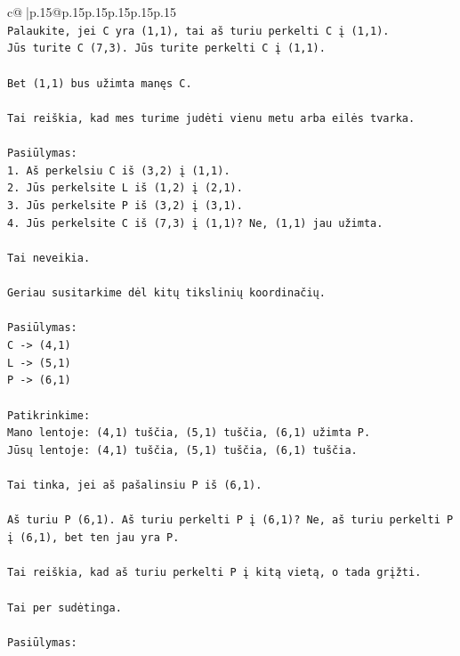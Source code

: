 \documentclass{article}
\begin{document}
{\begin{supertabular}{c@{$\;$}|p{.15\linewidth}@{}p{.15\linewidth}p{.15\linewidth}p{.15\linewidth}p{.15\linewidth}p{.15\linewidth}}
{{{\\ 
\texttt{Palaukite, jei C yra (1,1), tai aš turiu perkelti C į (1,1).} \\
\texttt{Jūs turite C (7,3). Jūs turite perkelti C į (1,1).} \\
\\ 
\texttt{Bet (1,1) bus užimta manęs C.} \\
\\ 
\texttt{Tai reiškia, kad mes turime judėti vienu metu arba eilės tvarka.} \\
\\ 
\texttt{Pasiūlymas:} \\
\texttt{1. Aš perkelsiu C iš (3,2) į (1,1).} \\
\texttt{2. Jūs perkelsite L iš (1,2) į (2,1).} \\
\texttt{3. Jūs perkelsite P iš (3,2) į (3,1).} \\
\texttt{4. Jūs perkelsite C iš (7,3) į (1,1)? Ne, (1,1) jau užimta.} \\
\\ 
\texttt{Tai neveikia.} \\
\\ 
\texttt{Geriau susitarkime dėl kitų tikslinių koordinačių.} \\
\\ 
\texttt{Pasiūlymas:} \\
\texttt{C {-}> (4,1)} \\
\texttt{L {-}> (5,1)} \\
\texttt{P {-}> (6,1)} \\
\\ 
\texttt{Patikrinkime:} \\
\texttt{Mano lentoje: (4,1) tuščia, (5,1) tuščia, (6,1) užimta P.} \\
\texttt{Jūsų lentoje: (4,1) tuščia, (5,1) tuščia, (6,1) tuščia.} \\
\\ 
\texttt{Tai tinka, jei aš pašalinsiu P iš (6,1).} \\
\\ 
\texttt{Aš turiu P (6,1). Aš turiu perkelti P į (6,1)? Ne, aš turiu perkelti P į (6,1), bet ten jau yra P.} \\
\\ 
\texttt{Tai reiškia, kad aš turiu perkelti P į kitą vietą, o tada grįžti.} \\
\\ 
\texttt{Tai per sudėtinga.} \\
\\ 
\texttt{Pasiūlymas:} \\
}}}
\end{supertabular}}
\end{document}
